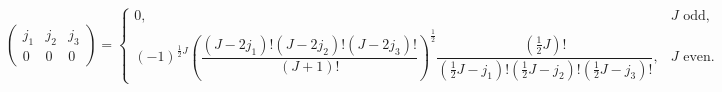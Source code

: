 \[\begin{pmatrix}j_{1}&j_{2}&j_{3}\\
0&0&0\end{pmatrix}=\begin{cases}0,&\mbox{$J$ odd},\\
(-1)^{\frac{1}{2}J}\left(\dfrac{(J-2j_{1})!(J-2j_{2})!(J-2j_{3})!}{(J+1)!}%
\right)^{\frac{1}{2}}\dfrac{(\frac{1}{2}J)!}{(\frac{1}{2}J-j_{1})!(\frac{1}{2}%
J-j_{2})!(\frac{1}{2}J-j_{3})!},&\mbox{$J$ even}.\end{cases}\]